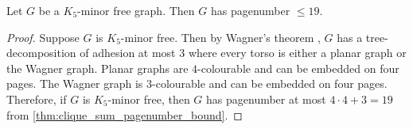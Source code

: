 \begin{theorem}
	Let \(G\) be a \(K_5\)-minor free graph. Then \(G\) has pagenumber \(\leq 19\).
\end{theorem}

\begin{proof}
	Suppose \(G\) is \(K_5\)-minor free. Then by Wagner's theorem \cite{wagnerUeberEigenschaftEbenen1937}, \(G\) has a tree-decomposition of adhesion at most 3 where every torso is either a planar graph or the Wagner graph.
	Planar graphs are \(4\)-colourable and can be embedded on four pages. The Wagner graph is \(3\)-colourable and can be embedded on four pages. Therefore, if \(G\) is \(K_5\)-minor free, then \(G\) has pagenumber at most \(4 \cdot 4 + 3 = 19\) from \cref{thm:clique_sum_pagenumber_bound}.
\end{proof}